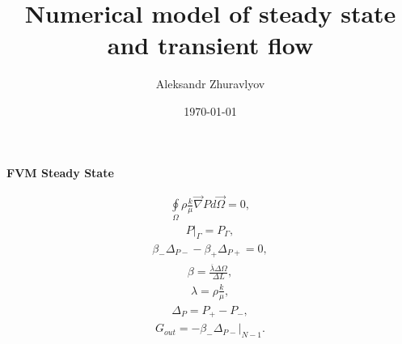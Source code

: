 \documentclass[a4paper,12pt]{extreport}
\author{Aleksandr Zhuravlyov}
\title{Numerical model of steady state and transient flow}
\date{\today}
\begin{document}
    \pagecolor{pageColor}
    \color{fontColor}

    \begin{multicols}{2}
        \begin{center}
        {\large \textbf{FVM Steady State}}
        \end{center}
        \begin{eqnarray}
            \label{eq:poisson_integral}
            \oint \limits_{\Omega} \rho \frac{k}{\mu} \vec{\nabla}P d\vec{\Omega} = 0,
        \end{eqnarray}
        \vspace{-0.5cm}
        \begin{eqnarray}
            \label{eq:poisson_integral_bound}
            P \Big|_\Gamma = P_\Gamma,
        \end{eqnarray}
        \begin{eqnarray}
            \label{eq:poisson_integral_num}
            \beta_{-}\Delta_{P-} - \beta_{+}\Delta_{P+} = 0,
        \end{eqnarray}
        \begin{eqnarray}
            \label{eq:beta}
            \beta = \frac{\overline{\lambda} \Delta \Omega}{\Delta L},
        \end{eqnarray}
        \begin{eqnarray}
            \label{eq:lambda}
            \lambda = \rho \frac{k}{\mu},
        \end{eqnarray}
        \begin{eqnarray}
            \label{eq:delta_P_num}
            \Delta_{P} = P_{+} - P_{-},
        \end{eqnarray}
        \begin{eqnarray}
            \label{eq:Consumption_poisson_integral}
            G_{out} = - \beta_-\Delta_{P-} \Big|_ {N-1}.
        \end{eqnarray}


\end{multicols}
\end{document}

